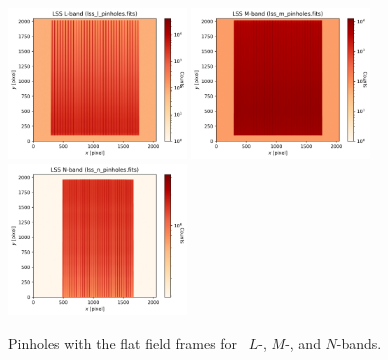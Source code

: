 \begin{figure}[!ht]
\centering
  \includegraphics[height=4cm,keepaspectratio]{figures/LSS_CrtAlg_files/lss_l_pinholes.fits.png}
  \includegraphics[height=4cm,keepaspectratio]{figures/LSS_CrtAlg_files/lss_m_pinholes.fits.png}
  \includegraphics[height=4cm,keepaspectratio]{figures/LSS_CrtAlg_files/lss_n_pinholes.fits.png}
  \caption[LSS pinhole frames]{Pinholes with the flat field frames for \lss~$L$-, $M$-, and $N$-bands.} 
  \label{fig:pinh}
\end{figure}

